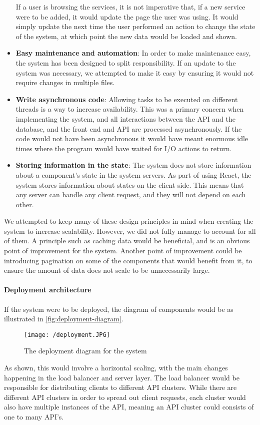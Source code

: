 \begin{itemize}
    If a user is browsing the services, it is not imperative that, if a new service were to be added, it would update the page the user was using.
    It would simply update the next time the user performed an action to change the state of the system, at which point the new data would be loaded and shown.
    \item \textbf{Easy maintenance and automation}: In order to make maintenance easy, the system has been designed to split responsibility.
    If an update to the system was necessary, we attempted to make it easy by ensuring it would not require changes in multiple files.
    \item \textbf{Write asynchronous code}: Allowing tasks to be executed on different threads is a way to increase availability. 
    This was a primary concern when implementing the system, and all interactions between the API and the database, and the front end and API are processed asynchronously.
    If the code would not have been asynchronous it would have meant enormous idle times where the program would have waited for I/O actions to return.
    \item \textbf{Storing information in the state}: The system does not store information about a component's state in the system servers.
    As part of using React, the system stores information about states on the client side.
    This means that any server can handle any client request, and they will not depend on each other.
\end{itemize}
We attempted to keep many of these design principles in mind when creating the system to increase scalability.
However, we did not fully manage to account for all of them.
A principle such as caching data would be beneficial, and is an obvious point of improvement for the system.
Another point of improvement could be introducing pagination on some of the components that would benefit from it, to ensure the amount of data does not scale to be unnecessarily large.

\paragraph{Deployment architecture}
If the system were to be deployed, the diagram of components would be as illustrated in \autoref{fig:deployment-diagram}.
\begin{figure}[H]
    \texttt{[image: /deployment.JPG]}
     \caption{The deployment diagram for the system}
     \label{fig:deployment-diagram}
 \end{figure}
 \noindent
As shown, this would involve a horizontal scaling, with the main changes happening in the load balancer and server layer.
The load balancer would be responsible for distributing clients to different API clusters.
While there are different API clusters in order to spread out client requests, each cluster would also have multiple instances of the API, meaning an API cluster could consists of one to many API's.

